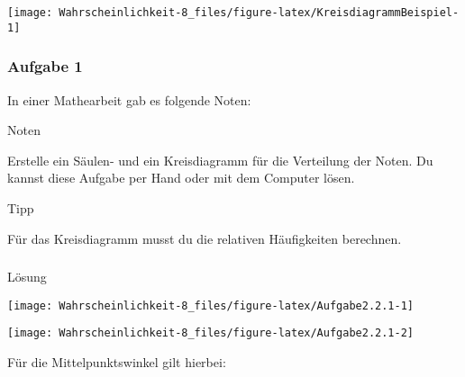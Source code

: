 \documentclass[
  ngerman,
]{book}
\begin{document}
\begin{center}\texttt{[image: Wahrscheinlichkeit-8\_files/figure-latex/KreisdiagrammBeispiel-1]} \end{center}

\hypertarget{section-15}{%
\subsubsection*{}\label{section-15}}

\hypertarget{aufgabe-1-2}{%
\subsubsection*{Aufgabe 1}\label{aufgabe-1-2}}

In einer Mathearbeit gab es folgende Noten:

Noten

Erstelle ein Säulen- und ein Kreisdiagramm für die Verteilung der Noten. Du kannst diese Aufgabe per Hand oder mit dem Computer lösen.

Tipp

Für das Kreisdiagramm musst du die relativen Häufigkeiten berechnen.

\hypertarget{section-16}{%
\subsubsection*{}\label{section-16}}

Lösung

\begin{center}\texttt{[image: Wahrscheinlichkeit-8\_files/figure-latex/Aufgabe2.2.1-1]} \end{center}

\begin{center}\texttt{[image: Wahrscheinlichkeit-8\_files/figure-latex/Aufgabe2.2.1-2]} \end{center}

Für die Mittelpunktswinkel gilt hierbei:
\end{document}

